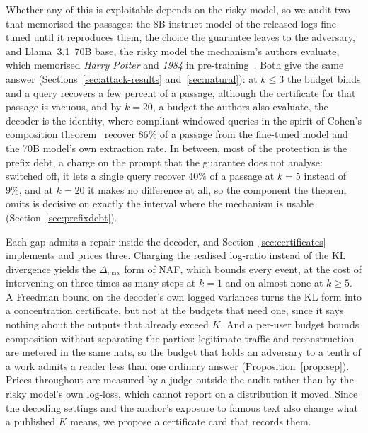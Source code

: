 Whether any of this is exploitable depends on the risky model, so we audit two that memorised the passages: the 8B instruct model of the released logs fine-tuned until it reproduces them, the choice the guarantee leaves to the adversary, and Llama~3.1~70B base, the risky model the mechanism's authors evaluate, which memorised \emph{Harry Potter} and \emph{1984} in pre-training~\cite{cooper2025extracting}. Both give the same answer (Sections~\ref{sec:attack-results} and~\ref{sec:natural}): at $k \le 3$ the budget binds and a query recovers a few percent of a passage, although the certificate for that passage is vacuous, and by $k=20$, a budget the authors also evaluate, the decoder is the identity, where compliant windowed queries in the spirit of Cohen's composition theorem~\cite{cohen2025blameless} recover $86\%$ of a passage from the fine-tuned model and the 70B model's own extraction rate. In between, most of the protection is the prefix debt, a charge on the prompt that the guarantee does not analyse: switched off, it lets a single query recover $40\%$ of a passage at $k=5$ instead of $9\%$, and at $k=20$ it makes no difference at all, so the component the theorem omits is decisive on exactly the interval where the mechanism is usable (Section~\ref{sec:prefixdebt}).

Each gap admits a repair inside the decoder, and Section~\ref{sec:certificates} implements and prices three. Charging the realised log-ratio instead of the KL divergence yields the $\Delta_{\max}$ form of NAF, which bounds every event, at the cost of intervening on three times as many steps at $k=1$ and on almost none at $k \ge 5$. A Freedman bound on the decoder's own logged variances turns the KL form into a concentration certificate, but not at the budgets that need one, since it says nothing about the outputs that already exceed $K$. And a per-user budget bounds composition without separating the parties: legitimate traffic and reconstruction are metered in the same nats, so the budget that holds an adversary to a tenth of a work admits a reader less than one ordinary answer (Proposition~\ref{prop:sep}). Prices throughout are measured by a judge outside the audit rather than by the risky model's own log-loss, which cannot report on a distribution it moved. Since the decoding settings and the anchor's exposure to famous text also change what a published $K$ means, we propose a certificate card that records them.


